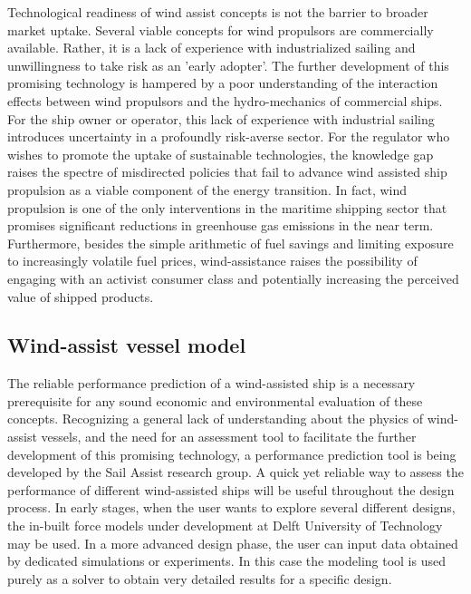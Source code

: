 \documentclass[twoside,twocolumn]{article}
\begin{document}
	Technological readiness of wind assist concepts is not the barrier to broader market uptake. Several viable concepts for wind propulsors are commercially available. Rather, it is a lack of experience with industrialized sailing and unwillingness to take risk as an 'early adopter'. The further development of this promising technology is hampered by a poor understanding of  the interaction effects between wind propulsors and the hydro-mechanics of commercial ships. For the ship owner or operator, this lack of experience with industrial sailing introduces uncertainty in a profoundly risk-averse sector. For the regulator who wishes to promote the uptake of sustainable technologies, the knowledge gap raises the spectre of misdirected policies that fail to advance wind assisted ship propulsion as a viable component of the energy transition. In fact, wind propulsion is one of the only interventions in the maritime shipping sector that promises significant reductions in greenhouse gas emissions in the near term. Furthermore, besides the simple arithmetic of fuel savings and limiting exposure to increasingly volatile fuel prices, wind-assistance raises the possibility of engaging with an activist consumer class and potentially increasing the perceived value of shipped products.
	
	\subsection{Wind-assist vessel model}
	The reliable performance prediction of a wind-assisted ship is a necessary prerequisite for any sound economic and environmental evaluation of these concepts. Recognizing a general lack of understanding about the physics of wind-assist vessels, and the need for an assessment tool to facilitate the further development of this promising technology, a performance prediction tool is being developed by the Sail Assist research group. A quick yet reliable way to assess the performance of different wind-assisted ships will be useful throughout the design process. In early stages, when the user wants to explore several different designs, the in-built force models under development at Delft University of Technology may be used. In a more advanced design phase, the user can input data obtained by dedicated simulations or experiments. In this case the modeling tool is used purely as a solver to obtain very detailed results for a specific design.
	
	
\end{document}
